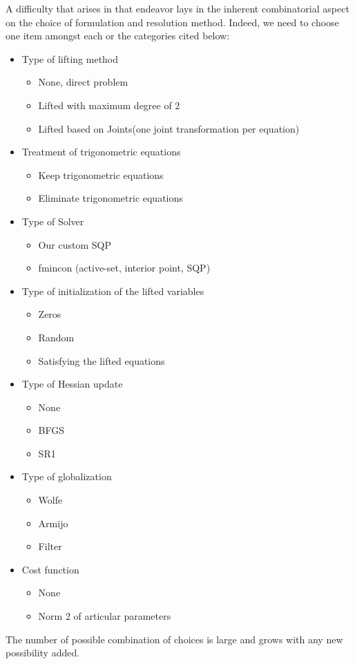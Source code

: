 A difficulty that arises in that endeavor lays in the inherent combinatorial aspect on the choice of formulation and resolution method.
Indeed, we need to choose one item amongst each or the categories cited below:
\begin{itemize}
  \item Type of lifting method
  \begin{itemize}
    \item None, direct problem
    \item Lifted with maximum degree of 2
    \item Lifted based on Joints(one joint transformation per equation)
  \end{itemize}
  \item Treatment of trigonometric equations
  \begin{itemize}
    \item Keep trigonometric equations
    \item Eliminate trigonometric equations
  \end{itemize}
  \item Type of Solver
  \begin{itemize}
    \item Our custom SQP
    \item fmincon (active-set, interior point, SQP)
  \end{itemize}
  \item Type of initialization of the lifted variables
  \begin{itemize}
    \item Zeros
    \item Random
    \item Satisfying the lifted equations
  \end{itemize}
  \item Type of Hessian update
  \begin{itemize}
    \item None
    \item BFGS
    \item SR1
  \end{itemize}
  \item Type of globalization
  \begin{itemize}
    \item Wolfe
    \item Armijo
    \item Filter
  \end{itemize}
  \item Cost function
  \begin{itemize}
    \item None
    \item Norm 2 of articular parameters
  \end{itemize}
\end{itemize}
The number of possible combination of choices is large and grows with any new possibility added.

